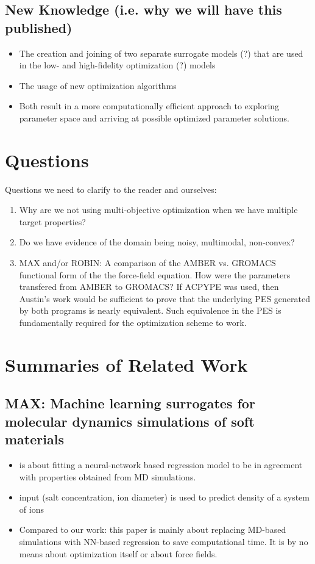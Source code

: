 \documentclass[preprint,12pt]{elsarticle}
\begin{document}
\subsection{New Knowledge (i.e. why we will have this published)}
\begin{itemize}
    \item The creation and joining of two separate surrogate models (?) that are used in the low- and high-fidelity optimization (?) models
    \item The usage of new optimization algorithms
    \item Both result in a more computationally efficient approach to exploring parameter space and arriving at possible optimized parameter solutions.
\end{itemize}

\section{Questions}
Questions we need to clarify to the reader and ourselves:
\begin{enumerate}
    \item Why are we not using multi-objective optimization when we have multiple target properties?
    \item Do we have evidence of the domain being noisy, multimodal, non-convex?
    \item MAX and/or ROBIN: A comparison of the AMBER vs. GROMACS functional form of the the force-field equation. How were the parameters transfered from AMBER to GROMACS? If ACPYPE was used, then Austin's work would be sufficient to prove that the underlying PES generated by both programs is nearly equivalent. Such equivalence in the PES is fundamentally required for the optimization scheme to work. 
\end{enumerate}




\noindent\makebox[\linewidth]{\rule{\paperwidth}{0.4pt}}

\section{Summaries of Related Work}
\subsection{ MAX: Machine learning surrogates for molecular dynamics simulations of soft materials}
\begin{itemize}
    \item is about fitting a neural-network based regression model to be in agreement with properties obtained from MD simulations.
    \item input (salt concentration, ion diameter) is used to predict density of a system of ions
    \item Compared to our work: this paper is mainly about replacing MD-based simulations with NN-based regression to save computational time. It is by no means about optimization itself or about force fields.
\end{itemize}
\end{document}
